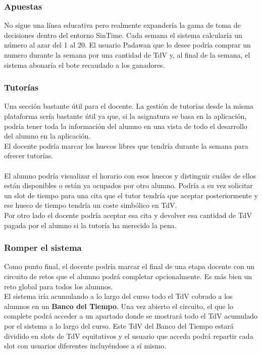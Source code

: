 \subsubsection{Apuestas}

No sigue una línea educativa pero realmente expandería la gama de toma de decisiones dentro del entorno SinTime. Cada semana el sistema calcularía un número al azar del 1 al 20. El usuario Padawan que lo desee podría comprar un numero durante la semana por una cantidad de TdV y, al final de la semana, el sistema abonaría el bote recaudado a los ganadores.\\

\subsubsection{Tutorías}

Una sección bastante útil para el docente. La gestión de tutorías desde la misma plataforma sería bastante útil ya que, si la asignatura se basa en la aplicación, podría tener toda la información del alumno en una vista de todo el desarrollo del alumno en la aplicación.\\

El docente podría marcar los huecos libres que tendría durante la semana para ofrecer tutorías. \\
\\
El alumno podría visualizar el horario con esos huecos y distinguir cuáles de ellos están disponibles o están ya ocupados por otro alumno. Podría a su vez solicitar un slot de tiempo para una cita que el tutor tendría que aceptar posteriormente y ese hueco de tiempo tendría un coste simbólico en TdV.\\

Por otro lado el docente podría aceptar esa cita y devolver esa cantidad de TdV pagada por el alumno si la tutoría ha merecido la pena.\\

\subsubsection{Romper el sistema}

Como punto final, el docente podría marcar el final de una etapa docente con un circuito de retos que el alumno podrá completar opcionalmente. Es más bien un reto global para todos los alumnos.\\

El sistema iría acumulando a lo largo del curso todo el TdV cobrado a los alumnos en un \textbf{Banco del Tiempo}. Una vez abierto el circuito, el que lo complete podrá acceder a un apartado donde se mostrará todo el TdV acumulado por el sistema a lo largo del curso. Este TdV del Banco del Tiempo estará dividido en slots de TdV equitativos y el usuario que acceda podrá repartir cada slot con usuarios diferentes incluyéndose a sí mismo.